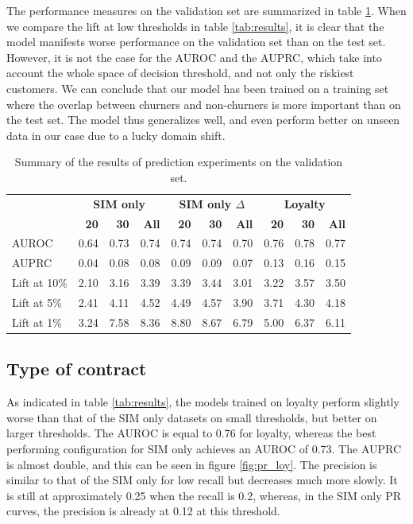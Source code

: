 The performance measures on the validation set are summarized in table
\ref{tab:results_valid}. When we compare the lift at low thresholds in table
\ref{tab:results}, it is clear that the model manifests worse performance on the
validation set than on the test set. However, it is not the case for the AUROC
and the AUPRC, which take into account the whole space of decision threshold,
and not only the riskiest customers. We can conclude that our model has been
trained on a training set where the overlap between churners and non-churners is
more important than on the test set. The model thus generalizes well, and even
perform better on unseen data in our case due to a lucky domain shift.

\begin{table}
    \centering
    \begin{tabular}{lrrrrrrrrr}
        \toprule
        & \multicolumn{3}{c}{\textbf{SIM only}}
        & \multicolumn{3}{c}{\textbf{SIM only $\Delta$}}
        & \multicolumn{3}{c}{\textbf{Loyalty}} \\
        \cmidrule(l){2-4} \cmidrule(l){5-7} \cmidrule(l){8-10}
        & \textbf{20} & \textbf{30} & \textbf{All} & \textbf{20} & \textbf{30} &
        \textbf{All} & \textbf{20} & \textbf{30} & \textbf{All} \\
        \midrule
        AUROC & 0.64 & 0.73 & 0.74 & 0.74 & 0.74 & 0.70 & 0.76 & 0.78 & 0.77 \\
        AUPRC & 0.04 & 0.08 & 0.08 & 0.09 & 0.09 & 0.07 & 0.13 & 0.16 & 0.15 \\
        Lift at 10\%  & 2.10 & 3.16 & 3.39 & 3.39 & 3.44 & 3.01 & 3.22 & 3.57 & 3.50 \\
        Lift at  5\%  & 2.41 & 4.11 & 4.52 & 4.49 & 4.57 & 3.90 & 3.71 & 4.30 & 4.18 \\
        Lift at  1\%  & 3.24 & 7.58 & 8.36 & 8.80 & 8.67 & 6.79 & 5.00 & 6.37 & 6.11 \\
        \bottomrule
    \end{tabular}
    \caption{Summary of the results of prediction experiments on the validation
    set.}
    \label{tab:results_valid}
\end{table}

\subsection{Type of contract}

As indicated in table \ref{tab:results}, the models trained on loyalty perform
slightly worse than that of the SIM only datasets on small thresholds, but better
on larger thresholds. The AUROC is equal to 0.76 for loyalty, whereas the best
performing configuration for SIM only achieves an AUROC of 0.73. The AUPRC is
almost double, and this can be seen in figure \ref{fig:pr_loy}. The
precision is similar to that of the SIM only for low recall but decreases much
more slowly. It is still at approximately 0.25 when the recall is 0.2, whereas,
in the SIM only PR curves, the precision is already at 0.12 at this threshold.

